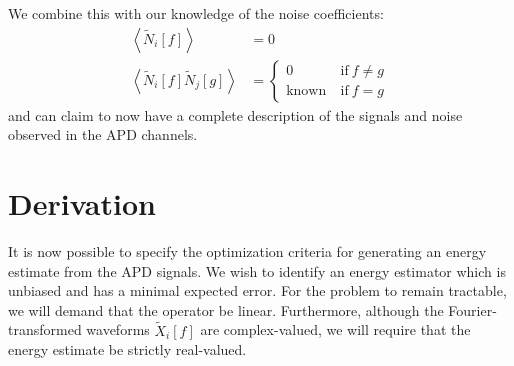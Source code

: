 We combine this with our knowledge of the noise coefficients:
\begin{align*}
\left< \widetilde{N}_i[f] \right> &= 0 \\
\left< \widetilde{N}_i[f] \widetilde{N}_j[g] \right> &= \left\{ \begin{aligned}
0~ &\text{if}~ f \ne g \\
\text{known}~ &\text{if}~ f = g
\end{aligned}\right.
\end{align*}
and can claim to now have a complete description of the signals and noise observed in the APD channels.

\section{Derivation}

It is now possible to specify the optimization criteria for generating an energy estimate from the APD signals.  We wish to identify an energy estimator which is unbiased and has a minimal expected error.  For the problem to remain tractable, we will demand that the operator be linear.  Furthermore, although the Fourier-transformed waveforms $\widetilde{X}_i[f]$ are complex-valued, we will require that the energy estimate be strictly real-valued.

